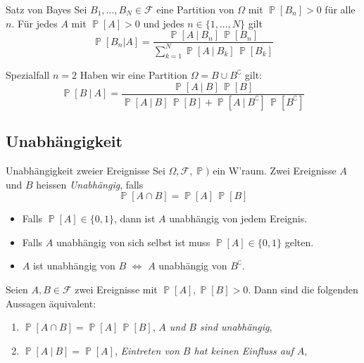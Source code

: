 \documentclass[a4paper,10pt]{article}
\def\F{\mathcal{F}}
\renewcommand{\P}{\operatorname{\mathbb{P}}}
\numberwithin{equation}{section}
\begin{document}
\begin{mainbox}{Satz von Bayes}
    Sei \( B_1, \dots, B_N \in \F \) eine Partition von \( \Omega \) mit \( \P[B_n] > 0 \) für alle \( n \). Für jedes \( A \) mit \( \P[A] > 0 \) und jedes \( n \in \{1, \dots, N\} \) gilt
    \[
        \P[B_n | A] = \frac{\P[A \: | \: B_n] \, \P[B_n]}{\sum_{k = 1}^N \P[A \: | \: B_k] \, \P[B_k]}
    \]

    \begin{subbox}{Spezialfall \( n = 2 \)}
        Haben wir eine Partition \( \Omega = B \cup B^\complement \) gilt:
        \[
            \P[B \: | \: A] = \frac{\P[A \: | \: B] \, \P[B]}{\P[A \: | \: B] \, \P[B] + \P[A \: | \: B^\complement] \, \P[B^\complement]}
        \]
    \end{subbox}
\end{mainbox}

\subsection{Unabhängigkeit}

\begin{mainbox}{Unabhängigkeit zweier Ereignisse}
    Sei \(\Omega, \F, \P) \) ein W'raum. Zwei Ereignisse \( A \) und \( B \) heissen \emph{Unabhängig}, falls
    \[
        \P[A \cap B] = \P[A] \, \P[B]
    \]
\end{mainbox}
\begin{itemize}
    \item Falls \( \P[A] \in \{0, 1\} \), dann ist \( A \) unabhängig von jedem Ereignis.
    \item Falls \( A \) unabhängig von sich selbst ist muss \( \P[A] \in \{0, 1\} \) gelten.
    \item \( A \) ist unabhängig von \( B \) \( \iff \) \( A \) unabhängig von \( B^\complement \).
\end{itemize}

\begin{subbox}{}
    Seien \( A, B \in \F \) zwei Ereignisse mit \( \P[A], \P[B] > 0 \). Dann sind die folgenden Aussagen äquivalent:
    \begin{enumerate}[label=(\roman*)]
        \item \( \P[A \cap B] = \P[A] \, \P[B] \), \emph{\( A \) und \( B \) sind unabhängig},
        \item \( \P[A \: | \: B] = \P[A] \), \emph{Eintreten von \( B \) hat keinen Einfluss auf \( A \)},
    \end{enumerate}
\end{subbox}
\end{document}
